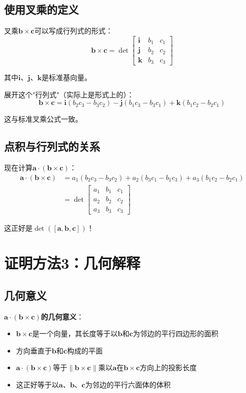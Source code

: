 \documentclass[12pt,a4paper]{article}
\begin{document}
\subsection{使用叉乘的定义}

叉乘$\bm{b} \times \bm{c}$可以写成行列式的形式：
\begin{equation}
\bm{b} \times \bm{c} = \det\begin{bmatrix} \bm{i} & b_1 & c_1 \\ \bm{j} & b_2 & c_2 \\ \bm{k} & b_3 & c_3 \end{bmatrix}
\end{equation}

其中$\bm{i}$、$\bm{j}$、$\bm{k}$是标准基向量。

展开这个"行列式"（实际上是形式上的）：
\begin{equation}
\bm{b} \times \bm{c} = \bm{i}(b_2 c_3 - b_3 c_2) - \bm{j}(b_1 c_3 - b_3 c_1) + \bm{k}(b_1 c_2 - b_2 c_1)
\end{equation}

这与标准叉乘公式一致。

\subsection{点积与行列式的关系}

现在计算$\bm{a} \cdot (\bm{b} \times \bm{c})$：
\begin{align}
\bm{a} \cdot (\bm{b} \times \bm{c}) &= a_1(b_2 c_3 - b_3 c_2) + a_2(b_3 c_1 - b_1 c_3) + a_3(b_1 c_2 - b_2 c_1) \\
&= \det\begin{bmatrix} a_1 & b_1 & c_1 \\ a_2 & b_2 & c_2 \\ a_3 & b_3 & c_3 \end{bmatrix}
\end{align}

这正好是$\det([\bm{a}, \bm{b}, \bm{c}])$！

\section{证明方法3：几何解释}

\subsection{几何意义}

\textbf{$\bm{a} \cdot (\bm{b} \times \bm{c})$的几何意义}：
\begin{itemize}
\item $\bm{b} \times \bm{c}$是一个向量，其长度等于以$\bm{b}$和$\bm{c}$为邻边的平行四边形的面积
\item 方向垂直于$\bm{b}$和$\bm{c}$构成的平面
\item $\bm{a} \cdot (\bm{b} \times \bm{c})$等于$\|\bm{b} \times \bm{c}\|$乘以$\bm{a}$在$\bm{b} \times \bm{c}$方向上的投影长度
\item 这正好等于以$\bm{a}$、$\bm{b}$、$\bm{c}$为邻边的平行六面体的体积
\end{itemize}
\end{document}
